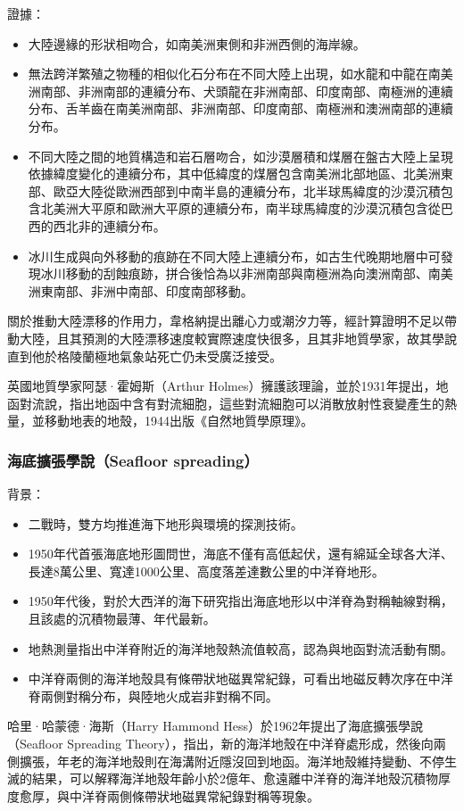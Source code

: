 \documentclass[a4paper,12pt]{report}
\begin{document}
證據：
\begin{itemize}
\item 大陸邊緣的形狀相吻合，如南美洲東側和非洲西側的海岸線。
\item 無法跨洋繁殖之物種的相似化石分布在不同大陸上出現，如水龍和中龍在南美洲南部、非洲南部的連續分布、犬頭龍在非洲南部、印度南部、南極洲的連續分布、舌羊齒在南美洲南部、非洲南部、印度南部、南極洲和澳洲南部的連續分布。
\item 不同大陸之間的地質構造和岩石層吻合，如沙漠層積和煤層在盤古大陸上呈現依據緯度變化的連續分布，其中低緯度的煤層包含南美洲北部地區、北美洲東部、歐亞大陸從歐洲西部到中南半島的連續分布，北半球馬緯度的沙漠沉積包含北美洲大平原和歐洲大平原的連續分布，南半球馬緯度的沙漠沉積包含從巴西的西北非的連續分布。
\item 冰川生成與向外移動的痕跡在不同大陸上連續分布，如古生代晚期地層中可發現冰川移動的刮蝕痕跡，拼合後恰為以非洲南部與南極洲為向澳洲南部、南美洲東南部、非洲中南部、印度南部移動。
\end{itemize}
關於推動大陸漂移的作用力，韋格納提出離心力或潮汐力等，經計算證明不足以帶動大陸，且其預測的大陸漂移速度較實際速度快很多，且其非地質學家，故其學說直到他於格陵蘭極地氣象站死亡仍未受廣泛接受。

英國地質學家阿瑟·霍姆斯（Arthur Holmes）擁護該理論，並於1931年提出，地函對流說，指出地函中含有對流細胞，這些對流細胞可以消散放射性衰變產生的熱量，並移動地表的地殼，1944出版《自然地質學原理》。
\subsubsection{海底擴張學說（Seafloor spreading）}
背景：
\begin{itemize}
\item 二戰時，雙方均推進海下地形與環境的探測技術。
\item 1950年代首張海底地形圖問世，海底不僅有高低起伏，還有綿延全球各大洋、長達8萬公里、寬達1000公里、高度落差達數公里的中洋脊地形。
\item 1950年代後，對於大西洋的海下研究指出海底地形以中洋脊為對稱軸線對稱，且該處的沉積物最薄、年代最新。
\item 地熱測量指出中洋脊附近的海洋地殼熱流值較高，認為與地函對流活動有關。
\item 中洋脊兩側的海洋地殼具有條帶狀地磁異常紀錄，可看出地磁反轉次序在中洋脊兩側對稱分布，與陸地火成岩非對稱不同。
\end{itemize}
哈里·哈蒙德·海斯（Harry Hammond Hess）於1962年提出了海底擴張學說（Seafloor Spreading Theory），指出，新的海洋地殼在中洋脊處形成，然後向兩側擴張，年老的海洋地殼則在海溝附近隱沒回到地函。海洋地殼維持變動、不停生滅的結果，可以解釋海洋地殼年齡小於2億年、愈遠離中洋脊的海洋地殼沉積物厚度愈厚，與中洋脊兩側條帶狀地磁異常紀錄對稱等現象。
\end{document}
